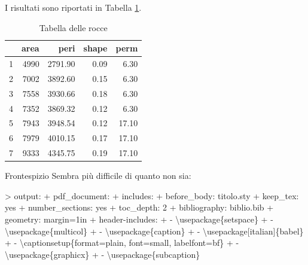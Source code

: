 \documentclass[
  ignorenonframetext,
]{beamer}
\newenvironment{Shaded}{}{}
\newcommand{\BuiltInTok}[1]{#1}
\newcommand{\ExtensionTok}[1]{#1}
\newcommand{\FunctionTok}[1]{#1}
\newcommand{\NormalTok}[1]{#1}
\begin{document}
\begin{frame}{}
\protect\hypertarget{section-4}{}
I risultati sono riportati in Tabella \ref{tab:tabella}.

\begin{table}[ht]
\centering
\caption{Tabella delle rocce} 
\label{tab:tabella}
\begin{tabular}{rrrrr}
  \hline
 & area & peri & shape & perm \\ 
  \hline
1 & 4990 & 2791.90 & 0.09 & 6.30 \\ 
  2 & 7002 & 3892.60 & 0.15 & 6.30 \\ 
  3 & 7558 & 3930.66 & 0.18 & 6.30 \\ 
  4 & 7352 & 3869.32 & 0.12 & 6.30 \\ 
  5 & 7943 & 3948.54 & 0.12 & 17.10 \\ 
  6 & 7979 & 4010.15 & 0.17 & 17.10 \\ 
  7 & 9333 & 4345.75 & 0.19 & 17.10 \\ 
   \hline
\end{tabular}
\end{table}
\end{frame}

\begin{frame}[fragile]{Frontespizio}
\protect\hypertarget{frontespizio}{}
Sembra più difficile di quanto non sia:

\footnotesize

\begin{Shaded}
\begin{Highlighting}[]
\NormalTok{\textgreater{} output: }
\NormalTok{+    pdf\_document:}
\NormalTok{+       includes:}
\NormalTok{+         before\_body: titolo.sty}
\NormalTok{+       keep\_tex: yes}
\NormalTok{+       number\_sections: yes}
\NormalTok{+       toc\_depth: 2}
\NormalTok{+ bibliography: biblio.bib}
\NormalTok{+ geometry: margin=1in}
\NormalTok{+ header{-}includes:}
\NormalTok{+   {-} }\BuiltInTok{\textbackslash{}usepackage}\NormalTok{\{}\ExtensionTok{setspace}\NormalTok{\} }
\NormalTok{+   {-} }\BuiltInTok{\textbackslash{}usepackage}\NormalTok{\{}\ExtensionTok{multicol}\NormalTok{\}}
\NormalTok{+   {-} }\BuiltInTok{\textbackslash{}usepackage}\NormalTok{\{}\ExtensionTok{caption}\NormalTok{\}}
\NormalTok{+   {-} }\BuiltInTok{\textbackslash{}usepackage}\NormalTok{[italian]\{}\ExtensionTok{babel}\NormalTok{\}}
\NormalTok{+   {-} }\FunctionTok{\textbackslash{}captionsetup}\NormalTok{\{format=plain, font=small, labelfont=bf\}}
\NormalTok{+   {-} }\BuiltInTok{\textbackslash{}usepackage}\NormalTok{\{}\ExtensionTok{graphicx}\NormalTok{\} }
\NormalTok{+   {-} }\BuiltInTok{\textbackslash{}usepackage}\NormalTok{\{}\ExtensionTok{subcaption}\NormalTok{\}}
\end{Highlighting}
\end{Shaded}
\end{frame}
\end{document}
